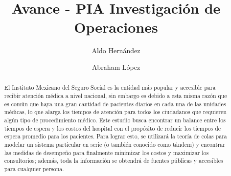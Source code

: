 \documentclass[10pt]{article}
\begin{document}
	\begin{opening}
		\title{Avance - PIA Investigación de Operaciones}
		\author[Universidad Autónoma de Nuevo León, San Nicolás de los Garza, aldo.hernandezt@uanl.edu.mx]{Aldo Hernández}
		\author[Universidad Autónoma de Nuevo León, San Nicolás de los Garza, abraham.lopezg@uanl.edu.mx]{Abraham López}
		
		\begin{abstract}
            El Instituto Mexicano del Seguro Social es la entidad más popular y accesible para recibir atención médica a nivel nacional, sin embargo es debido a esta misma razón que es común que haya una gran cantidad de pacientes diarios en cada una de las unidades médicas, lo que alarga los tiempos de atención para todos los ciudadanos que requieren algún tipo de procedimiento médico. Este estudio busca encontrar un balance entre los tiempos de espera y los costos del hospital con el propósito de reducir los tiempos de espera promedio para los pacientes. Para lograr esto, se utilizará la teoría de colas para modelar un sistema particular en serie (o también conocido como tándem) y encontrar las medidas de desempeño para finalmente minimizar los costos y maximizar los consultorios; además, toda la información se obtendrá de fuentes públicas y accesibles para cualquier persona.
		\end{abstract}

	\end{opening}
	
\end{document}
